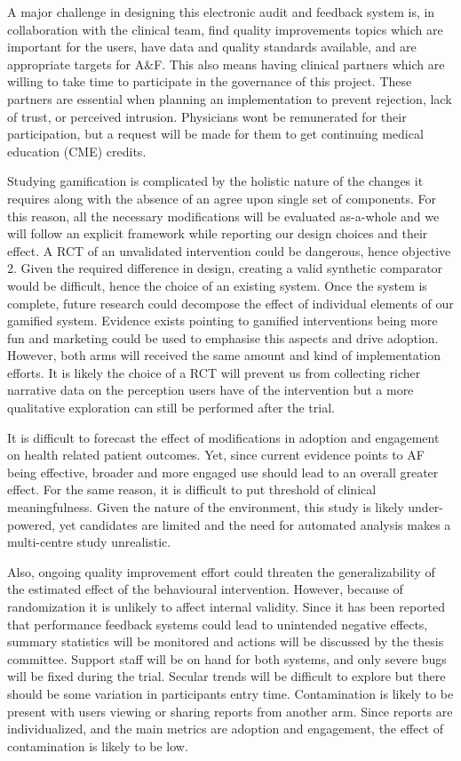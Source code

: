 A major challenge in designing this electronic audit and feedback system is, in collaboration with the clinical team, find quality improvements topics which are important for the users, have data and quality standards available, and are appropriate targets for A\&F. This also means having clinical partners which are willing to take time to participate in the governance of this project. These partners are essential when planning an implementation to prevent rejection, lack of trust, or perceived intrusion. Physicians wont be remunerated for their participation, but a request will be made for them to get continuing medical education (CME) credits.

Studying gamification is complicated by the holistic nature of the changes it requires along with the absence of an agree upon single set of components. For this reason, all the necessary modifications will be evaluated as-a-whole and we will follow an explicit framework while reporting our design choices and their effect. A RCT of an unvalidated  intervention could be dangerous, hence objective 2. Given the required difference in design, creating a valid synthetic comparator would be difficult, hence the choice of an existing system. Once the system is complete, future research could decompose the effect of individual elements of our gamified system. Evidence exists pointing to gamified interventions being more fun and marketing could be used to emphasise this aspects and drive adoption. However, both arms will received the same amount and kind of implementation efforts. It is likely the choice of a RCT will prevent us from collecting richer narrative data on the perception users have of the intervention but a more qualitative exploration can still be performed after the trial.

It is difficult to forecast the effect of modifications in adoption and engagement on health related patient outcomes. Yet, since current evidence points to \gls{AF} being effective, broader and more engaged use should lead to an overall greater effect. For the same reason, it is difficult to put threshold of clinical meaningfulness. Given the nature of the environment, this study is likely under-powered, yet candidates are limited and the need for automated analysis makes a multi-centre study unrealistic.

Also, ongoing quality improvement effort could threaten the generalizability of the estimated effect of the behavioural intervention. However, because of randomization it is unlikely to affect internal validity. Since it has been reported that performance feedback systems could lead to unintended negative effects, summary statistics will be monitored and actions will be discussed by the thesis committee.\cite{terris2009attribution} Support staff will be on hand for both systems, and only severe bugs will be fixed during the trial. Secular trends will be difficult to explore but there should be some variation in participants entry time. Contamination is likely to be present with users viewing or sharing reports from another arm. Since reports are individualized, and the main metrics are adoption and engagement, the effect of contamination is likely to be low.

